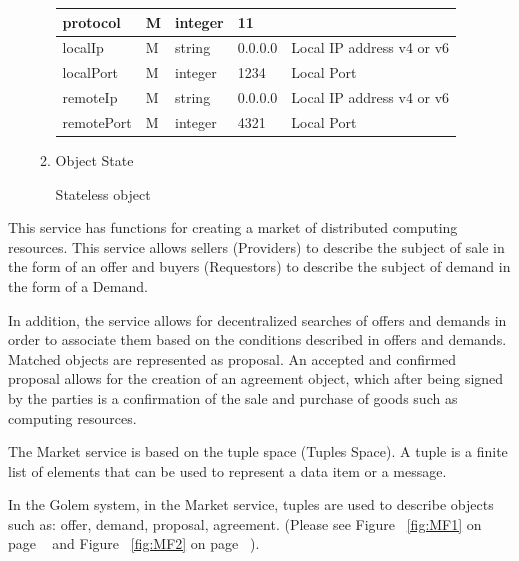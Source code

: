 \begin{enumerate}
\begin{enumerate}
\begin{table}[H]
\begin{center}
\begin{tabular}{|p{3cm}|l|p{3cm}|p{3cm}|p{4cm}|}
protocol 		& M & integer & 11		&  \\
\hline 		

localIp 		& M & string  & 0.0.0.0	& Local IP address v4 or v6 \\
\hline

localPort 		& M & integer & 1234	& Local Port \\
\hline 

remoteIp 		& M & string  & 0.0.0.0	& Local IP address v4 or v6 \\
\hline

remotePort 		& M & integer & 4321	& Local Port \\
\hline 

\end{tabular}
\end{center}

\end{table}

\item Object State

Stateless object

\end{enumerate}


\end{enumerate}

\break


This service has functions for creating a market of distributed computing resources.
This service allows sellers (Providers) to describe the subject of sale in the form of an offer
and buyers (Requestors) to describe the subject of demand in the form of a Demand.

In addition, the service allows for decentralized searches of offers and demands in order to associate them
based on the conditions described in offers and demands. Matched objects are represented as
proposal. An accepted and confirmed proposal allows for the creation of an agreement object, which
after being signed by the parties is a confirmation of the sale and purchase of goods such as computing resources.

The Market service is based on the tuple space (Tuples Space).
A tuple is a finite list of elements that can be used to represent a data item or a message.

In the Golem system, in the Market service, tuples are used to describe objects such as:
offer, demand, proposal, agreement. (Please see Figure ~\ref{fig:MF1} on page ~\pageref{fig:MF1}
and Figure ~\ref{fig:MF2} on page ~\pageref{fig:MF2}).

